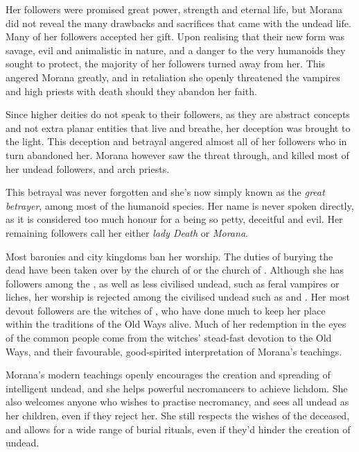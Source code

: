 Her followers were promised great power, strength and eternal life, but Morana
did not reveal the many drawbacks and sacrifices that came with the undead
life. Many of her followers accepted her gift. Upon realising that their new
form was savage, evil and animalistic in nature, and a danger to the very
humanoids they sought to protect, the majority of her followers turned away
from her. This angered Morana greatly, and in retaliation she openly
threatened the vampires and high priests with death should they abandon her
faith.

Since higher deities do not speak to their followers, as they are abstract
concepts and not extra planar entities that live and breathe, her deception
was brought to the light. This deception and betrayal angered almost all of
her followers who in turn abandoned her. Morana however saw the threat through,
and killed most of her undead followers, and arch priests.

This betrayal was never forgotten and she's now simply known as the
\emph{great betrayer}, among most of the humanoid species. Her name is never
spoken directly, as it is considered too much honour for a being so petty,
deceitful and evil. Her remaining followers call her either \emph{lady Death}
or \emph{Morana}.


Most baronies and city kingdoms ban her worship. The duties of burying the
dead have been taken over by the church of  or the church
of . Although she has followers among the ,
as well as less civilised undead, such as feral vampires or liches, her worship
is rejected among the civilised undead such as  and
. Her most devout followers are the witches of
, who have done much to keep her place within the
traditions of the Old Ways alive. Much of her redemption in the eyes of the
common people come from the witches' stead-fast devotion to the Old Ways, and
their favourable, good-spirited interpretation of Morana's teachings.

Morana's modern teachings openly encourages the creation and spreading of
intelligent undead, and she helps powerful necromancers to achieve
lichdom. She also welcomes anyone who wishes to practise necromancy, and sees
all undead as her children, even if they reject her. She still respects the
wishes of the deceased, and allows for a wide range of burial rituals, even if
they'd hinder the creation of undead.

